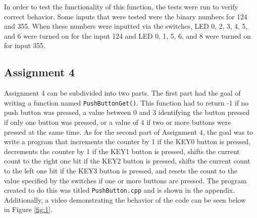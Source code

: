 \documentclass[
	letterpaper, %
	10pt, %
]{CSUniSchoolLabReport}
\begin{document}


In order to test the functionality of this function, the tests were run to verify correct behavior. Some inputs that were tested were the binary numbers for 124 and 355. When these numbers were inputted via the switches, LED 0, 2, 3, 4, 5, and 6 were turned on for the input 124 and LED 0, 1, 5, 6, and 8 were turned on for input 355. 

\subsection{Assignment 4}

Assignment 4 can be subdivided into two parts. The first part had the goal of writing a function named \texttt{PushButtonGet()}. This function had to return -1 if no push button was pressed, a value between 0 and 3 identifying the button pressed if only one button was pressed, or a value of 4 if two or more buttons were pressed at the same time. As for the second part of Assignment 4, the goal was to write a program that increments the counter by 1 if the KEY0 button is pressed, decrements the counter by 1 if the KEY1 button is pressed, shifts the current count to the right one bit if the KEY2 button is pressed, shifts the current count to the left one bit if the KEY3 button is pressed, and resets the count to the value specified by the switches if one or more buttons are pressed. The program created to do this was titled \texttt{PushButton.cpp} and is shown in the appendix. Additionally, a video demonstrating the behavior of the code can be seen below in Figure \ref{fig:1}.
\end{document}
